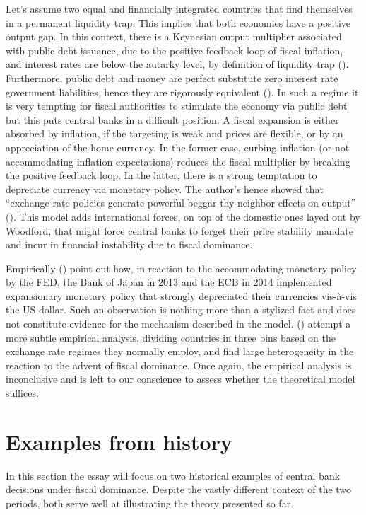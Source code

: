 \documentclass[american]{scrartcl}
\newcommand{\citein}[1]{\citeauthor{#1} (\citeyear{#1})}
\begin{document}
Let's assume two equal and financially integrated countries that find themselves in a permanent liquidity trap. This implies that both economies have a positive output gap. In this context, there is a Keynesian output multiplier associated with public debt issuance, due to the positive feedback loop of fiscal inflation, and interest rates are below the autarky level, by definition of liquidity trap (\cite[p. 41]{Caballero2016}). Furthermore, public debt and money are perfect substitute zero interest rate government liabilities, hence they are rigorously equivalent (\cite[p. 42]{Caballero2016}). In such a regime it is very tempting for fiscal authorities to stimulate the economy via public debt but this puts central banks in a difficult position. A fiscal expansion is either absorbed by inflation, if the targeting is weak and prices are flexible, or by an appreciation of the home currency. In the former case, curbing inflation (or not accommodating inflation expectations) reduces the fiscal multiplier by breaking the positive feedback loop. In the latter, there is a strong temptation to depreciate currency via monetary policy. The author's hence showed that ``exchange rate policies generate powerful beggar-thy-neighbor effects on output'' (\cite[p. 32]{Caballero2016}). This model adds international forces, on top of the domestic ones layed out by Woodford, that might force central banks to forget their price stability mandate and incur in financial instability due to fiscal dominance.

Empirically \citein{Caballero2016} point out how, in reaction to the accommodating monetary policy by the FED, the Bank of Japan in 2013 and the ECB in 2014 implemented expansionary monetary policy that strongly depreciated their currencies vis-à-vis the US dollar. Such an observation is nothing more than a stylized fact and does not constitute evidence for the mechanism described in the model. \citein{Ahmed2021} attempt a more subtle empirical analysis, dividing countries in three bins based on the exchange rate regimes they normally employ, and find large heterogeneity in the reaction to the advent of fiscal dominance. Once again, the empirical analysis is inconclusive and is left to our conscience to assess whether the theoretical model suffices.

\section{Examples from history}

In this section the essay will focus on two historical examples of central bank decisions under fiscal dominance. Despite the vastly different context of the two periods, both serve well at illustrating the theory presented so far.
\end{document}
